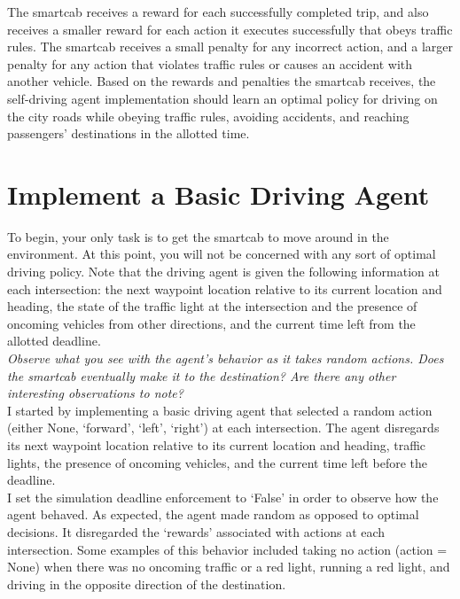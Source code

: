 \documentclass[11pt]{article}
\begin{document}
The smartcab receives a reward for each successfully completed trip, and also receives a smaller reward for each action it executes successfully that obeys traffic rules. The smartcab receives a small penalty for any incorrect action, and a larger penalty for any action that violates traffic rules or causes an accident with another vehicle. Based on the rewards and penalties the smartcab receives, the self-driving agent implementation should learn an optimal policy for driving on the city roads while obeying traffic rules, avoiding accidents, and reaching passengers’ destinations in the allotted time.

\section{Implement a Basic Driving Agent}

To begin, your only task is to get the smartcab to move around in the environment. At this point, you will not be concerned with any sort of optimal driving policy. Note that the driving agent is given the following information at each intersection: the next waypoint location relative to its current location and heading, the state of the traffic light at the intersection and the presence of oncoming vehicles from other directions,
and the current time left from the allotted deadline.\\

\textit{Observe what you see with the agent's behavior as it takes random actions. Does the smartcab eventually make it to the destination? Are there any other interesting observations to note?}\\

I started by implementing a basic driving agent that selected a random action (either None, ‘forward’, ‘left’, ‘right’) at each intersection. The agent disregards its next waypoint location relative to its current location and heading, traffic lights, the presence of oncoming vehicles, and the current time left before the deadline.\\

I set the simulation deadline enforcement to ‘False’ in order to observe how the agent behaved. As expected, the agent made random as opposed to optimal decisions. It disregarded the ‘rewards’ associated with actions at each intersection. Some examples of this behavior included taking no action (action = None) when there was no oncoming traffic or a red light, running a red light, and driving in the opposite direction of the destination.\\
\end{document}
